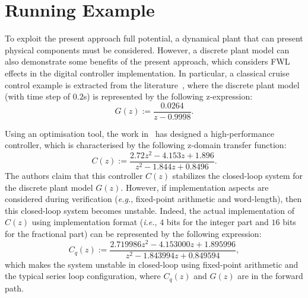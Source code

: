\documentclass{sig-alternate-05-2015}
\begin{document}
\section{Running Example} \label{sec:running-ex}

To exploit the present approach full potential, a dynamical plant that can
present physical components must be considered.  However, a discrete plant
model can also demonstrate some benefits of the present approach, which
considers FWL effects in the digital controller implementation.  In
particular, a classical cruise control example is extracted from the
literature~\cite{Astrom08}, where the discrete plant model (with time step
of $0.2$s) is represented by the following z-expression:
%
\begin{equation}
\label{Eq:running-example-plant}
G\left(z\right) := \frac{0.0264}{z-0.9998}.
\end{equation}

Using an optimisation tool, the work in~\cite{DBLP:conf/hybrid/WangGRJF16}
has designed a high-performance controller, which is characterised by the
following z-domain transfer function:
%
\begin{equation}
\label{Eq:running-example-controller}
C\left(z\right) := \frac{2.72z^2 - 4.153z + 1.896}{z^2 - 1.844z + 0.8496}.
\end{equation}
%
The authors claim that this controller $C(z)$ stabilizes the closed-loop
system for the discrete plant model $G(z)$.  However, if implementation
aspects are considered during verification ({\it e.g.}, fixed-point
arithmetic and word-length), then this closed-loop system becomes unstable.
%
Indeed, the actual implementation of $C(z)$ using 
implementation format ({\it i.e.}, $4$ bits for the integer part and $16$
bits for the fractional part) can be represented by the following
expression:
%
\begin{equation}
\label{Eq:running-example-controller-quantized}
C_{q}\left(z\right) {:=} \frac{2.719986z^2{-}4.153000z
{+}1.895996}{z^2{-}1.843994z+0.849594},
\end{equation} 
%
which makes the system unstable in closed-loop using fixed-point arithmetic
and the typical series loop configuration, where $C_{q}\left(z\right)$ and
$G\left(z\right)$ are in the forward path.

\end{document}
